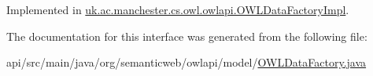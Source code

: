 Implemented in \hyperlink{classuk_1_1ac_1_1manchester_1_1cs_1_1owl_1_1owlapi_1_1_o_w_l_data_factory_impl_afdbcdb465aa2200ac8d0e28e641937a3}{uk.\-ac.\-manchester.\-cs.\-owl.\-owlapi.\-O\-W\-L\-Data\-Factory\-Impl}.



The documentation for this interface was generated from the following file\-:\begin{DoxyCompactItemize}
\item 
api/src/main/java/org/semanticweb/owlapi/model/\hyperlink{_o_w_l_data_factory_8java}{O\-W\-L\-Data\-Factory.\-java}\end{DoxyCompactItemize}
